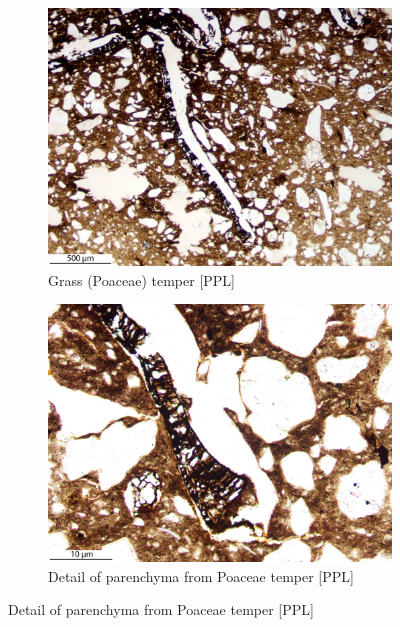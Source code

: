 \documentclass[a4paper]{article}
\begin{document}
\begin{figure}[H]
\begin{subfigure}[t]{.32\textwidth}
		\includegraphics[width=\textwidth]{ThinSections/48-2_4x_PPL.jpg}
		\caption{Grass (Poaceae) temper [PPL]}
	\end{subfigure}\hspace{.1em}\hfill
	\begin{subfigure}[t]{.32\textwidth}
		\includegraphics[width=\textwidth]{ThinSections/48-2_20x_PPL.jpg}
		\caption{Detail of parenchyma from Poaceae temper [PPL]}
	\end{subfigure}\hspace{.5em}\hfill

\end{figure}
\end{document}
